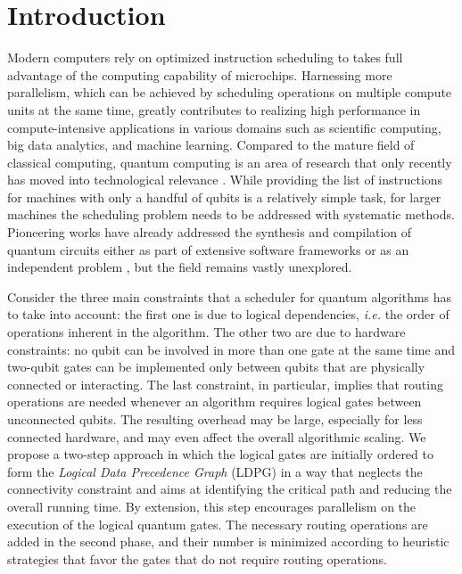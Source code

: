 \documentclass[%
onecolumn,pra,
superscriptaddress,
nofootinbib,
 amsmath,amssymb,
 aps,
11pt,
]{revtex4-1}
\def\note#1{\textbf{\color{red}[#1]}}
\begin{document}

\section{Introduction}
\label{sec:introduction}

Modern computers rely on optimized instruction scheduling to takes full advantage of the computing capability of microchips. Harnessing more parallelism, which can be achieved by scheduling operations on multiple compute units at the same time, greatly contributes to realizing high performance in compute-intensive applications in various domains such as scientific computing, big data analytics, and machine learning.
Compared to the mature field of classical computing, quantum computing is an area of research that only recently has moved into technological relevance \cite{Johnson2011,Devitt2016,Barends2016,Versluis2016a,IBM2017,Sete2016}.
While providing the list of instructions for machines with only a handful of qubits is a relatively simple task, for larger machines the scheduling problem needs to be addressed with systematic methods. Pioneering works have already addressed the synthesis and compilation of quantum circuits either as part of extensive software frameworks \cite{Wecker2014,Smith2016a,Steiger2016} or as an independent problem \cite{Beals2013,Brierley2015a,Martinez2016,Venturelli2018}, but the field remains vastly unexplored.

Consider the three main constraints that a scheduler for quantum algorithms has to take into account: the first one is due to logical dependencies, \emph{i.e.} the order of operations inherent in the algorithm. The other two are due to hardware constraints: no qubit can be involved in more than one gate at the same time and two-qubit gates can be implemented only between qubits that are physically connected or interacting. The last constraint, in particular, implies that routing operations are needed whenever an algorithm requires logical gates between unconnected qubits. The resulting overhead may be large, especially for less connected hardware, and may even affect the overall algorithmic scaling.
We propose a two-step approach in which the logical gates are initially ordered to form the {\em Logical Data Precedence Graph} (LDPG) in a way that neglects the connectivity constraint and aims at identifying the critical path and reducing the overall running time. By extension, this step encourages parallelism on the execution of the logical quantum gates. The necessary routing operations are added in the second phase, and their number is minimized according to heuristic strategies that favor the gates that do not require routing operations.
\end{document}
